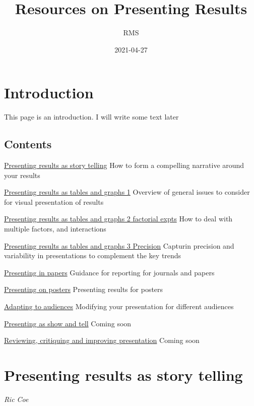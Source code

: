\documentclass[
]{book}
\title{Resources on Presenting Results}
\author{RMS}
\date{2021-04-27}
\begin{document}
\maketitle

{
\setcounter{tocdepth}{1}
\tableofcontents
}
\hypertarget{introduction}{%
\chapter{Introduction}\label{introduction}}

This page is an introduction. I will write some text later

\hypertarget{contents}{%
\section{Contents}\label{contents}}

\protect\hyperlink{story}{Presenting results as story telling}
How to form a compelling narrative around your results

\protect\hyperlink{tablegraph1}{Presenting results as tables and graphs 1}
Overview of general issues to consider for visual presentation of results

\protect\hyperlink{factor}{Presenting results as tables and graphs 2 factorial expts}
How to deal with multiple factors, and interactions

\protect\hyperlink{precision}{Presenting results as tables and graphs 3 Precision}
Capturin precision and variability in presentations to complement the key trends

\protect\hyperlink{papers}{Presenting in papers}
Guidance for reporting for journals and papers

\protect\hyperlink{posters}{Presenting on posters}
Presenting results for posters

\protect\hyperlink{audience}{Adapting to audiences}
Modifying your presentation for different audiences

\protect\hyperlink{showandtell}{Presenting as show and tell}
Coming soon

\protect\hyperlink{review}{Reviewing, critiquing and improving presentation}
Coming soon

\hypertarget{story}{%
\chapter{Presenting results as story telling}\label{story}}

\emph{Ric Coe}
\end{document}
